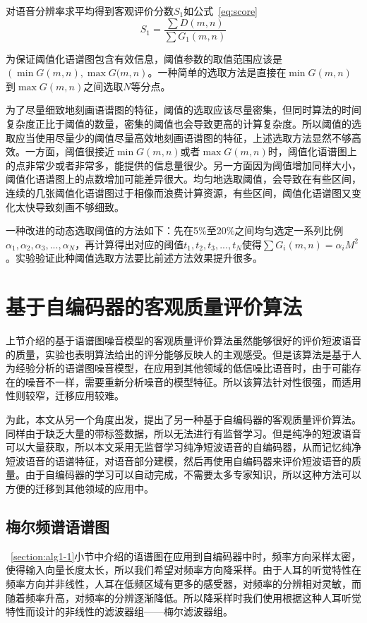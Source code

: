 对语音分辨率求平均得到客观评价分数$S_1$如公式~\ref{eq:score}
\begin{equation}\label{eq:score}
S_1 = \frac{\sum D(m,n)}{\sum G_1(m,n)}
\end{equation}

为保证阈值化语谱图包含有效信息，阈值参数的取值范围应该是$(\min{G(m,n)}, \max{G(m,n})$。一种简单的选取方法是直接在$\min{G(m,n)}$到$\max{G(m,n)}$之间选取$N$等分点。

为了尽量细致地刻画语谱图的特征，阈值的选取应该尽量密集，但同时算法的时间复杂度正比于阈值的数量，密集的阈值也会导致更高的计算复杂度。所以阈值的选取应当使用尽量少的阈值尽量高效地刻画语谱图的特征，上述选取方法显然不够高效。一方面，阈值很接近$\min{G(m,n)}$或者$\max{G(m,n)}$时，阈值化语谱图上的点非常少或者非常多，能提供的信息量很少。另一方面因为阈值增加同样大小，阈值化语谱图上的点数增加可能差异很大。均匀地选取阈值，会导致在有些区间，连续的几张阈值化语谱图过于相像而浪费计算资源，有些区间，阈值化语谱图又变化太快导致刻画不够细致。

一种改进的动态选取阈值的方法如下：先在5\%至20\%之间均匀选定一系列比例$\alpha_1,\alpha_2,\alpha_3,...,\alpha_N$，再计算得出对应的阈值$t_1,t_2,t_3,...,t_N$使得$\sum G_i(m,n)=\alpha_i M^2$。实验验证此种阈值选取方法要比前述方法效果提升很多。


\section{基于自编码器的客观质量评价算法}

上节介绍的基于语谱图噪音模型的客观质量评价算法虽然能够很好的评价短波语音的质量，实验也表明算法给出的评分能够反映人的主观感受。但是该算法是基于人为经验分析的语谱图噪音模型，在应用到其他领域的低信噪比语音时，由于可能存在的噪音不一样，需要重新分析噪音的模型特征。所以该算法针对性很强，而适用性则较窄，迁移应用较难。

为此，本文从另一个角度出发，提出了另一种基于自编码器的客观质量评价算法。同样由于缺乏大量的带标签数据，所以无法进行有监督学习。但是纯净的短波语音可以大量获取，所以本文采用无监督学习纯净短波语音的自编码器，从而记忆纯净短波语音的语谱特征，对语音部分建模，然后再使用自编码器来评价短波语音的质量。由于自编码器的学习可以自动完成，不需要太多专家知识，所以这种方法可以方便的迁移到其他领域的应用中。

\subsection{梅尔频谱语谱图}

~\ref{section:alg1-1}小节中介绍的语谱图在应用到自编码器中时，频率方向采样太密，使得输入向量长度太长，所以我们希望对频率方向降采样。由于人耳的听觉特性在频率方向并非线性，人耳在低频区域有更多的感受器，对频率的分辨相对灵敏，而随着频率升高，对频率的分辨逐渐降低。所以降采样时我们使用根据这种人耳听觉特性而设计的非线性的滤波器组——梅尔滤波器组。

